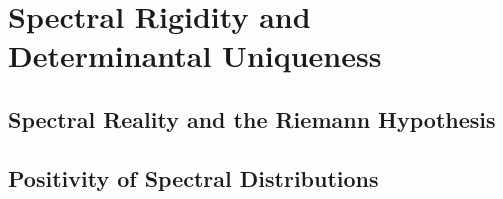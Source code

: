 \section{Spectral Rigidity and Determinantal Uniqueness}
\label{sec:spectral-rigidity}



\subsection{Spectral Reality and the Riemann Hypothesis}






















\subsection{Positivity of Spectral Distributions}

